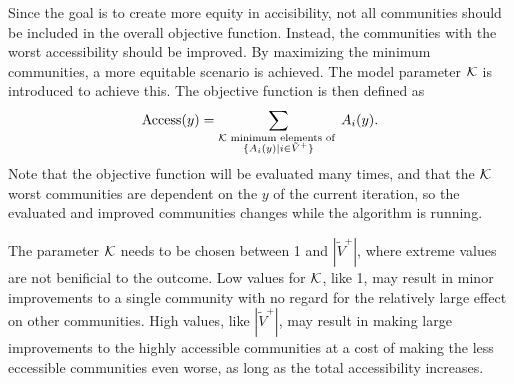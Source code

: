 Since the goal is to create more equity in accisibility, not all communities should be included in the overall objective function. Instead, the communities with the worst accessibility should be improved. By maximizing the minimum communities, a more equitable scenario is achieved. The model parameter $\mathcal{K}$ is introduced to achieve this. The objective function is then defined as
\begin{equation*}
    \text{Access}(y) = \sum_{\substack{\mathcal{K} \text{ minimum elements of }\\ {\{A_i(y)| i\in \tilde V^+\}}}} A_i(y).
\end{equation*}
Note that the objective function will be evaluated many times, and that the $\mathcal{K}$ worst communities are dependent on the $y$ of the current iteration, so the evaluated and improved communities changes while the algorithm is running.

The parameter $\mathcal{K}$ needs to be chosen between 1 and $|\tilde V^+|$, where extreme values are not benificial to the outcome. Low values for $\mathcal{K}$, like 1, may result in minor improvements to a single community with no regard for the relatively large effect on other communities. High values, like $|\tilde V^+|$, may result in making large improvements to the highly accessible communities at a cost of making the less eccessible communities even worse, as long as the total accessibility increases.

